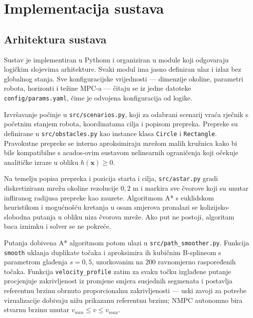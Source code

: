 
\chapter{Implementacija sustava}
\label{pog:implementacija}

\section{Arhitektura sustava}

Sustav je implementiran u Pythonu i organiziran u module koji odgovaraju logičkim slojevima arhitekture. Svaki modul ima jasno definiran ulaz i izlaz bez globalnog stanja. Sve konfiguracijske vrijednosti --- dimenzije okoline, parametri robota, horizonti i težine MPC-a --- čitaju se iz jedne datoteke \texttt{config/params.yaml}, čime je odvojena konfiguracija od logike.

Izvršavanje počinje u \texttt{src/scenarios.py}, koji za odabrani scenarij vraća rječnik s početnim stanjem robota, koordinatama cilja i popisom prepreka. Prepreke su definirane u \texttt{src/obstacles.py} kao instance klasa \texttt{Circle} i \texttt{Rectangle}. Pravokutne prepreke se interno aproksimiraju mrežom malih kružnica kako bi bile kompatibilne s acados-ovim sustavom nelinearnih ograničenja koji očekuje analitičke izraze u obliku $h(\mathbf{x}) \geq 0$.

Na temelju popisa prepreka i pozicija starta i cilja, \texttt{src/astar.py} gradi diskretiziranu mrežu okoline rezolucije $0{,}2$ m i markira sve čvorove koji su unutar infliranog radijusa prepreke kao zauzete. Algoritmom A* s euklidskom heuristikom i mogućnošću kretanja u osam smjerova pronalazi se kolizijsko-slobodna putanja u obliku niza čvorova mreže. Ako put ne postoji, algoritam baca iznimku i solver se ne pokreće.

Putanja dobivena A* algoritmom potom ulazi u \texttt{src/path\_smoother.py}. Funkcija \texttt{smooth} uklanja duplikate točaka i aproksimira ih kubičnim B-splineom s parametrom glađenja $s{=}0{,}5$, uzorkovanim na $200$ ravnomjerno raspoređenih točaka. Funkcija \texttt{velocity\_profile} zatim za svaku točku izglađene putanje procjenjuje zakrivljenost iz promjene smjera susjednih segmenata i postavlja referentnu brzinu obrnuto proporcionalnu zakrivljenosti --- uski zavoji za potrebe vizualizacije dobivaju nižu prikazanu referentnu brzinu; NMPC autonomno bira stvarnu brzinu unutar $v_{min} \leq v \leq v_{max}$.

